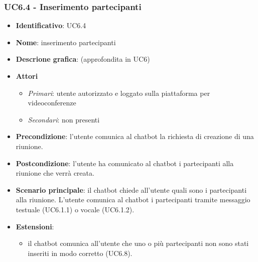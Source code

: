 \subsubsection{UC6.4 - Inserimento partecipanti}
\begin{itemize}
    \item \textbf{Identificativo}: UC6.4
    \item \textbf{Nome}: inserimento partecipanti
    \item \textbf{Descrione grafica}: (approfondita in UC6)
    \item \textbf{Attori}
 \begin{itemize} 
    \item \textit{Primari}: utente autorizzato e loggato sulla piattaforma per videoconferenze
    \item \textit{Secondari}: non presenti
 \end{itemize}
 \item \textbf{Precondizione}: l'utente comunica al chatbot la richiesta di creazione di una riunione.
 \item \textbf{Postcondizione}: l'utente ha comunicato al chatbot i partecipanti alla riunione che verrà creata.
 \item \textbf{Scenario principale}: il chatbot chiede all'utente quali sono i partecipanti alla riunione. L'utente comunica al chatbot i partecipanti tramite messaggio testuale (UC6.1.1) o vocale (UC6.1.2).
 \item \textbf{Estensioni}: 
 \begin{itemize} 
    \item il chatbot comunica all'utente che uno o più partecipanti non sono stati inseriti in modo corretto (UC6.8).
 \end{itemize}
\end{itemize}
